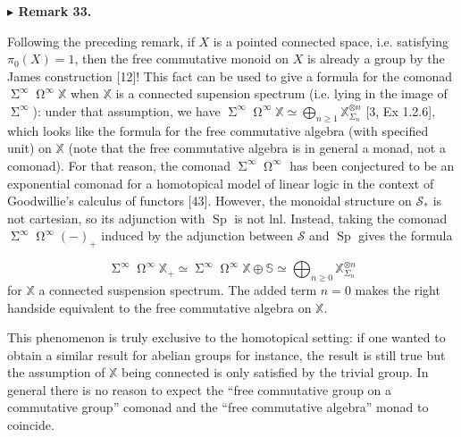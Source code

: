 \documentclass[10pt,a4paper]{article}
\begin{document}
 
 
 
\par\medskip\noindent\textbf{$\blacktriangleright$ Remark 33.}\par
 
 
Following the preceding remark, if $X$ is a pointed connected space, i.e. satisfying $\pi_{0}(X)=1$, then the free commutative monoid on $X$ is already a group by the James construction [12]! This fact can be used to give a formula for the comonad $\operatorname{\Sigma}^{\infty}\operatorname{\Omega}^{\infty}\mathbb{X}$ when $\mathbb{X}$ is a connected supension spectrum (i.e. lying in the image of $\operatorname{\Sigma}^{\infty}$): under that assumption, we have $\operatorname{\Sigma}^{\infty}\operatorname{\Omega}^{\infty}\mathbb{X}\simeq\bigoplus_{n\geq 1}\mathbb{X}^{\otimes n}_{\Sigma_{n}}$ [3, Ex 1.2.6], which looks like the formula for the free commutative algebra (with specified unit) on $\mathbb{X}$ (note that the free commutative algebra is in general a monad, not a comonad). For that reason, the comonad $\operatorname{\Sigma}^{\infty}\operatorname{\Omega}^{\infty}$ has been conjectured to be an exponential comonad for a homotopical model of linear logic in the context of Goodwillie’s calculus of functors [43]. However, the monoidal structure on ${\mathcal{S}}_{*}$ is not cartesian, so its adjunction with $\operatorname{Sp}$ is not lnl. Instead, taking the comonad $\operatorname{\Sigma}^{\infty}\operatorname{\Omega}^{\infty}(-)_{+}$ induced by the adjunction between ${\mathcal{S}}$ and $\operatorname{Sp}$ gives the formula\par
    \[\operatorname{\Sigma}^{\infty}\operatorname{\Omega}^{\infty}\mathbb{X}_{+}\simeq\operatorname{\Sigma}^{\infty}\operatorname{\Omega}^{\infty}\mathbb{X}\oplus\mathbb{S}\simeq\bigoplus_{n\geq 0}\mathbb{X}^{\otimes n}_{\Sigma_{n}}\]    
for $\mathbb{X}$ a connected suspension spectrum. The added term $n=0$ makes the right handside equivalent to the free commutative algebra on $\mathbb{X}$.\par
 
 
 
This phenomenon is truly exclusive to the homotopical setting: if one wanted to obtain a similar result for abelian groups for instance, the result is still true but the assumption of $\mathbb{X}$ being connected is only satisfied by the trivial group. In general there is no reason to expect the “free commutative group on a commutative group” comonad and the “free commutative algebra” monad to coincide.\par
 
\end{document}
